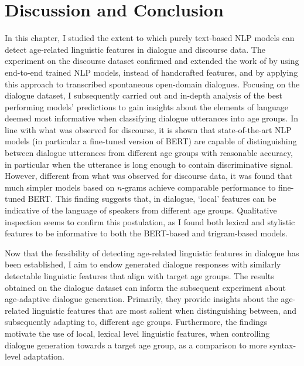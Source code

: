 \section{Discussion and Conclusion}\label{sec:exp1_discussion_conclusion}

In this chapter, I studied the extent to which purely text-based NLP models can detect age-related linguistic features in dialogue and discourse data.
The experiment on the discourse dataset confirmed and extended the work of \cite{schler2006effects} by using end-to-end trained NLP models, instead of handcrafted features, and by applying this approach to transcribed spontaneous open-domain dialogues.
Focusing on the dialogue dataset, I subsequently carried out and in-depth analysis of the best performing models' predictions to gain insights about the elements of language deemed most informative when classifying dialogue utterances into age groups.
In line with what was observed for discourse, it is shown that state-of-the-art NLP models (in particular a fine-tuned version of BERT) are capable of distinguishing between dialogue utterances from different age groups with reasonable accuracy, in particular when the utterance is long enough to contain discriminative signal.
However, different from what was observed for discourse data, it was found that much simpler models based on $n$-grams achieve comparable performance to fine-tuned BERT. 
This finding suggests that, in dialogue, ‘local’ features can be indicative of the language of speakers from different age groups. Qualitative inspection seems to confirm this postulation, as I found both lexical and stylistic features to be informative to both the BERT-based and trigram-based models.

Now that the feasibility of detecting age-related linguistic features in dialogue has been established, I aim to endow generated dialogue responses with similarly detectable linguistic features that align with target age groups. 
The results obtained on the dialogue dataset can inform the subsequent experiment about age-adaptive dialogue generation. 
Primarily, they provide insights about the age-related linguistic features that are most salient when distinguishing between, and subsequently adapting to, different age groups.
Furthermore, the findings motivate the use of local, lexical level linguistic features, when controlling dialogue generation towards a target age group, as a comparison to more syntax-level adaptation.

